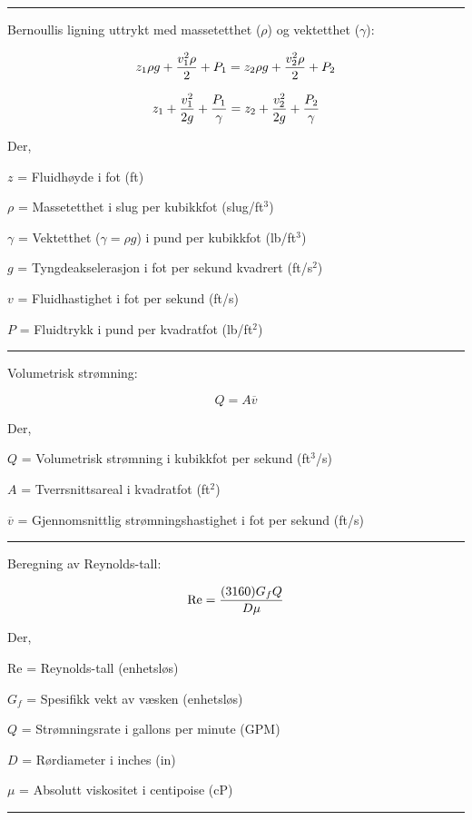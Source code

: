 

\vskip 10pt
\hrule
\vskip 10pt

Bernoullis ligning uttrykt med massetetthet ($\rho$) og vektetthet ($\gamma$):

$$z_1 \rho g + {v_1^2 \rho \over 2} + P_1 = z_2 \rho g + {v_2^2 \rho \over 2} + P_2$$

$$z_1 + {v_1^2 \over {2 g}} + {P_1 \over \gamma} = z_2 + {v_2^2 \over {2 g}} + {P_2 \over \gamma}$$

\noindent
Der,

$z$ = Fluidhøyde i fot (ft)

$\rho$ = Massetetthet i slug per kubikkfot (slug/ft$^{3}$)

$\gamma$ = Vektetthet ($\gamma = \rho g$) i pund per kubikkfot (lb/ft$^{3}$)

$g$ = Tyngdeakselerasjon i fot per sekund kvadrert (ft/s$^{2}$)

$v$ = Fluidhastighet i fot per sekund (ft/s)

$P$ = Fluidtrykk i pund per kvadratfot (lb/ft$^{2}$)

\vskip 10pt
\hrule
\vskip 10pt

Volumetrisk strømning:

$$Q = A \overline{v}$$

\noindent
Der,

$Q$ = Volumetrisk strømning i kubikkfot per sekund (ft$^{3}$/s)

$A$ = Tverrsnittsareal i kvadratfot (ft$^{2}$)

$\overline{v}$ = Gjennomsnittlig strømningshastighet i fot per sekund (ft/s)
\vskip 10pt
\hrule
\vskip 10pt

Beregning av Reynolds-tall:

$$\hbox{Re} = {{(3160) G_f Q} \over {D \mu}}$$

\noindent
Der,

Re = Reynolds-tall (enhetsløs)

$G_f$ = Spesifikk vekt av væsken (enhetsløs)

$Q$ = Strømningsrate i gallons per minute (GPM)

$D$ = Rørdiameter i inches (in)

$\mu$ = Absolutt viskositet i centipoise (cP)

\vskip 10pt
\hrule
\vskip 10pt

